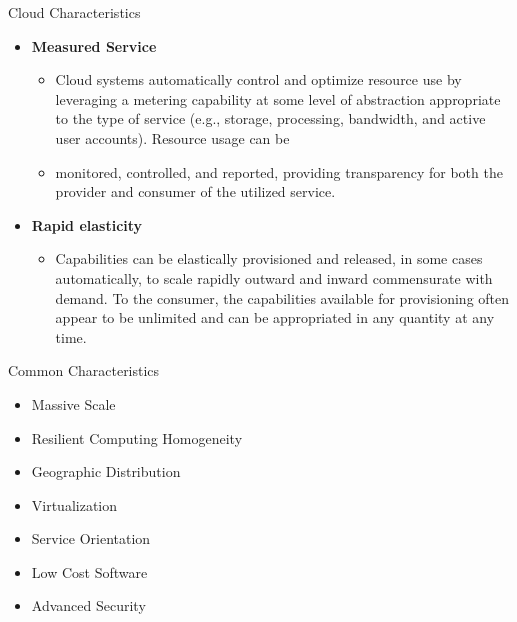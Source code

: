 \documentclass{SKP-beamer}
\begin{document}
\begin{frame}{ Cloud Characteristics}
	\begin{itemize}
		
		\item  \textbf{Measured Service}
		\begin{itemize}
			\item Cloud systems automatically control and optimize resource use by leveraging a metering 
			capability at some level of abstraction appropriate to the type of service (e.g., storage, 
			processing, bandwidth, and active user accounts). Resource usage can be
			\item monitored, controlled, and reported, providing transparency for both the provider and 
			consumer of the utilized service.
			
		\end{itemize}
		\item \textbf{Rapid elasticity}
		\begin{itemize}
			
			\item Capabilities can be elastically provisioned and released, in some cases automatically, 
			to scale rapidly outward and inward commensurate with demand. To the consumer, 
			the capabilities available for provisioning often appear to be unlimited and can be appropriated in any quantity at any time.
		\end{itemize}
	\end{itemize}
\end{frame}


\begin{frame}{ Common Characteristics}
	\begin{itemize}
		
		\item Massive Scale
		\item Resilient Computing Homogeneity
		\item Geographic Distribution
		\item Virtualization
		\item Service Orientation
		\item Low Cost Software
		\item Advanced Security
		
		
	\end{itemize}
\end{frame}
\end{document}
